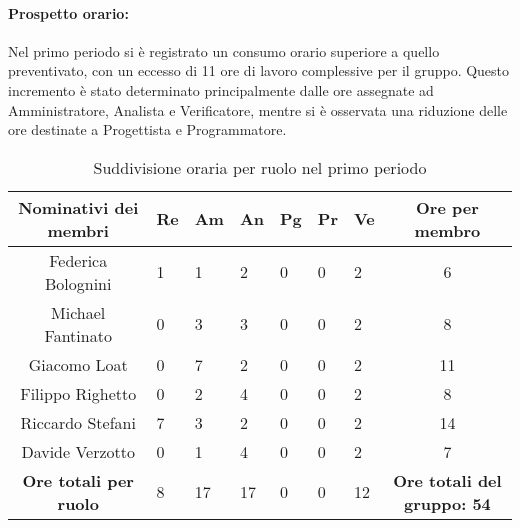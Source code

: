 \paragraph{Prospetto orario: }
Nel primo periodo si è registrato un consumo orario superiore a quello preventivato, con un eccesso di 11 ore di lavoro complessive per il gruppo. Questo incremento è stato determinato principalmente dalle ore assegnate ad Amministratore, Analista e Verificatore, mentre si è osservata una riduzione delle ore destinate a Progettista e Programmatore.
\begin{table}[h!]
    \centering
    \renewcommand{\arraystretch}{1.5}
    \begin{tabularx}{\textwidth}{|c|X|X|X|X|X|X|c|}\hline
    \rowcolor[HTML]{FFD700} 
    \textbf{Nominativi dei membri} & \textbf{Re} & \textbf{Am} & \textbf{An} & \textbf{Pg} & \textbf{Pr} & \textbf{Ve} & \textbf{Ore per membro} \\ \hline
    Federica Bolognini & 1 & 1 & 2 & 0 & 0 & 2 & 6  \\ \hline
    Michael Fantinato  & 0 & 3 & 3 & 0 & 0 & 2 & 8  \\ \hline
    Giacomo Loat       & 0 & 7 & 2 & 0 & 0 & 2 & 11 \\ \hline
    Filippo Righetto   & 0 & 2 & 4 & 0 & 0 & 2 & 8  \\ \hline
    Riccardo Stefani   & 7 & 3 & 2 & 0 & 0 & 2 & 14 \\ \hline
    Davide Verzotto    & 0 & 1 & 4 & 0 & 0 & 2 & 7  \\ \hline
    \rowcolor[HTML]{FFD700} 
    \textbf{Ore totali per ruolo} & 8 & 17 & 17 & 0 & 0 & 12 & \textbf{Ore totali del gruppo: 54} \\ \hline
    \end{tabularx}
    \caption{Suddivisione oraria per ruolo nel primo periodo}
\end{table}

